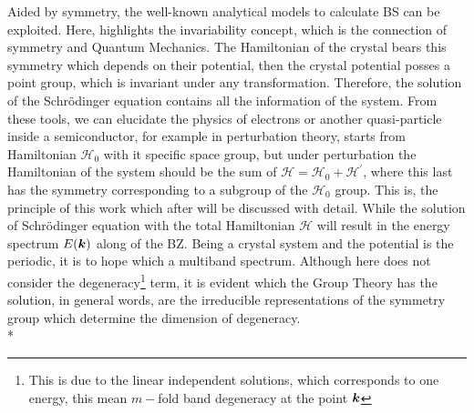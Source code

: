 Aided by symmetry, the well-known analytical models to calculate \gls{BS} can be exploited. Here, highlights the invariability concept, which is the connection of symmetry and Quantum Mechanics.  The Hamiltonian of the crystal bears this symmetry which depends on their potential, then the crystal potential posses a point group, which is invariant under any transformation. Therefore, the solution of the Schrödinger equation contains all the information of the system. From these tools, we can elucidate the physics of electrons or another quasi-particle inside a semiconductor, for example in perturbation theory, starts from Hamiltonian $\mathscr{H}_{0}$ with it specific space group, but under perturbation the Hamiltonian of the system should be the sum of $\mathscr{H}=\mathscr{H}_{0}+\mathscr{H}^{\prime}$, where this last has the symmetry corresponding to a subgroup of the $\mathscr{H}_{0}$ group.
This is, the principle of this work which after will be discussed with detail. While the solution of Schrödinger equation with the total Hamiltonian $\mathscr{H}$ will result in the energy spectrum $E(\boldsymbol{k})$ along of the \gls{BZ}. Being a crystal system and the potential is the periodic, it is to hope which a multiband spectrum. Although here does not consider the degeneracy\footnote{This is due to the  linear independent solutions, which corresponds to one energy, this mean $m-$fold  band degeneracy at the point $\boldsymbol{k}$\cite{bir1974symmetry}} term, it is evident which the Group Theory has the solution, in general words,   are the irreducible representations of the symmetry group which determine the dimension of degeneracy\cite{bir1974symmetry}. \\*
